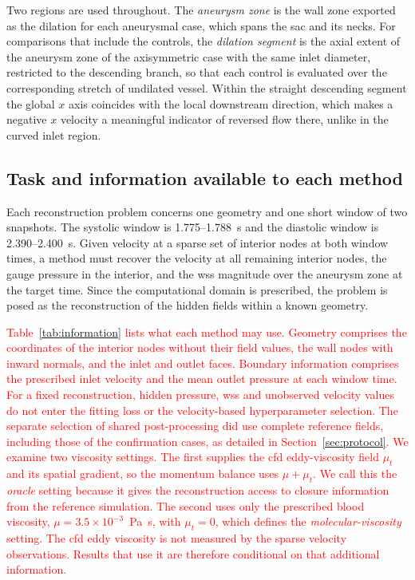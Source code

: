 \documentclass[12pt,a4paper]{article}
\newcommand{\CFD}{\ac{cfd}\xspace}
\newcommand{\WSS}{\ac{wss}\xspace}
\theoremstyle{definition}
\numberwithin{equation}{section}
\newcommand{\revision}[1]{\textcolor{red}{#1}}
\begin{document}
Two regions are used throughout. The \emph{aneurysm zone} is the wall zone exported as the dilation for each aneurysmal case, which spans the sac and its necks. For comparisons that include the controls, the \emph{dilation segment} is the axial extent of the aneurysm zone of the axisymmetric case with the same inlet diameter, restricted to the descending branch, so that each control is evaluated over the corresponding stretch of undilated vessel. Within the straight descending segment the global $x$ axis coincides with the local downstream direction, which makes a negative $x$ velocity a meaningful indicator of reversed flow there, unlike in the curved inlet region.

\subsection{Task and information available to each method}
\label{sec:task}
Each reconstruction problem concerns one geometry and one short window of two snapshots. %
The systolic window is 1.775--1.788~s and the diastolic window is 2.390--2.400~s. Given velocity at a sparse set of interior nodes at both window times, a method must recover the velocity at all remaining interior nodes, the gauge pressure in the interior, and the \WSS magnitude over the aneurysm zone at the target time. Since the computational domain is prescribed, the problem is posed as the reconstruction of the hidden fields within a known geometry.

\revision{Table~\ref{tab:information} lists what each method may use. Geometry comprises the coordinates of the interior nodes without their field values, the wall nodes with inward normals, and the inlet and outlet faces. Boundary information comprises the prescribed inlet velocity and the mean outlet pressure at each window time. For a fixed reconstruction, hidden pressure, \WSS and unobserved velocity values do not enter the fitting loss or the velocity-based hyperparameter selection. The separate selection of shared post-processing did use complete reference fields, including those of the confirmation cases, as detailed in Section~\ref{sec:protocol}. We examine two viscosity settings. The first supplies the \CFD eddy-viscosity field $\mu_t$ and its spatial gradient, so the momentum balance uses $\mu+\mu_t$. We call this the \emph{oracle} setting because it gives the reconstruction access to closure information from the reference simulation. The second uses only the prescribed blood viscosity, $\mu=3.5\times10^{-3}$~Pa~s, with $\mu_t=0$, which defines the \emph{molecular-viscosity} setting. The \CFD eddy viscosity is not measured by the sparse velocity observations. Results that use it are therefore conditional on that additional information.}
\end{document}
